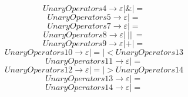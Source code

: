 \documentclass{article}
\begin{document}
\begin{equation}
	UnaryOperators4 \rightarrow \varepsilon | \& | =
\end{equation}
\begin{equation}
	UnaryOperators5 \rightarrow \varepsilon | =
\end{equation}
\begin{equation}
	UnaryOperators7 \rightarrow \varepsilon | =
\end{equation}
\begin{equation}
	UnaryOperators8 \rightarrow \varepsilon | \ | | \ =
\end{equation}
\begin{equation}
	UnaryOperators9 \rightarrow \varepsilon | + | =
\end{equation}
\begin{equation}
	UnaryOperators10 \rightarrow \varepsilon | = | < UnaryOperators13
\end{equation}
\begin{equation}
	UnaryOperators11 \rightarrow \varepsilon | =
\end{equation}
\begin{equation}
	UnaryOperators12 \rightarrow \varepsilon | = | > UnaryOperators14
\end{equation}
\begin{equation}
	UnaryOperators13 \rightarrow \varepsilon | =
\end{equation}
\begin{equation}
	UnaryOperators14 \rightarrow \varepsilon | =
\end{equation}
\end{document}
